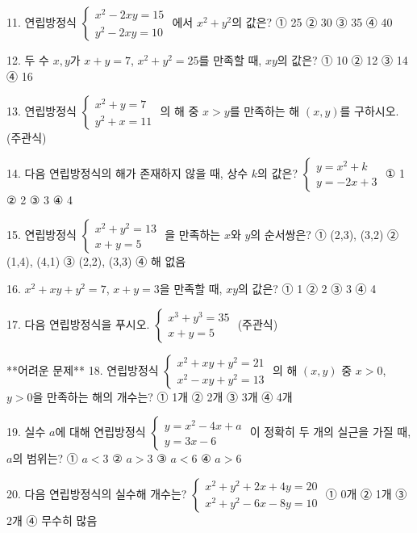 \documentclass[fleqn]{article}
\begin{document}
11. 연립방정식  
\( \begin{cases} x^2 - 2xy = 15 \\ y^2 - 2xy = 10 \end{cases} \)  
에서 \( x^2 + y^2 \)의 값은?  
① 25 ② 30 ③ 35 ④ 40  

12. 두 수 \( x, y \)가 \( x + y = 7 \), \( x^2 + y^2 = 25 \)를 만족할 때, \( xy \)의 값은?  
① 10 ② 12 ③ 14 ④ 16  

13. 연립방정식  
\( \begin{cases} x^2 + y = 7 \\ y^2 + x = 11 \end{cases} \)  
의 해 중 \( x > y \)를 만족하는 해 \( (x,y) \)를 구하시오.  
(주관식)  

14. 다음 연립방정식의 해가 존재하지 않을 때, 상수 \( k \)의 값은?  
\( \begin{cases} y = x^2 + k \\ y = -2x + 3 \end{cases} \)  
① 1 ② 2 ③ 3 ④ 4  

15. 연립방정식  
\( \begin{cases} x^2 + y^2 = 13 \\ x + y = 5 \end{cases} \)  
을 만족하는 \( x \)와 \( y \)의 순서쌍은?  
① (2,3), (3,2) ② (1,4), (4,1) ③ (2,2), (3,3) ④ 해 없음  

16. \( x^2 + xy + y^2 = 7 \), \( x + y = 3 \)을 만족할 때, \( xy \)의 값은?  
① 1 ② 2 ③ 3 ④ 4  

17. 다음 연립방정식을 푸시오.  
\( \begin{cases} x^3 + y^3 = 35 \\ x + y = 5 \end{cases} \)  
(주관식)  

**어려운 문제**  
18. 연립방정식  
\( \begin{cases} x^2 + xy + y^2 = 21 \\ x^2 - xy + y^2 = 13 \end{cases} \)  
의 해 \( (x,y) \) 중 \( x > 0 \), \( y > 0 \)을 만족하는 해의 개수는?  
① 1개 ② 2개 ③ 3개 ④ 4개  

19. 실수 \( a \)에 대해 연립방정식  
\( \begin{cases} y = x^2 - 4x + a \\ y = 3x - 6 \end{cases} \)  
이 정확히 두 개의 실근을 가질 때, \( a \)의 범위는?  
① \( a < 3 \) ② \( a > 3 \) ③ \( a < 6 \) ④ \( a > 6 \)  

20. 다음 연립방정식의 실수해 개수는?  
\( \begin{cases} x^2 + y^2 + 2x + 4y = 20 \\ x^2 + y^2 - 6x - 8y = 10 \end{cases} \)  
① 0개 ② 1개 ③ 2개 ④ 무수히 많음  

      
    
\end{document}
